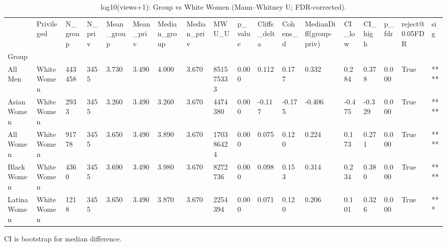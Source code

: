 \begin{table}[htbp]
\centering
\caption{log10(views+1): Group vs White Women (Mann–Whitney U; FDR-corrected).}
\label{tab:05-bias-views}
\begin{tabular}{llllllllllllllllll}
\toprule
 & Privileged & N\_group & N\_priv & Mean\_group & Mean\_priv & Median\_group & Median\_priv & MWU\_U & p\_value & Cliffs\_delta & Cohens\_d & MedianDiff(group-priv) & CI\_low & CI\_high & p\_fdr & reject@0.05FDR & sig \\
Group &  &  &  &  &  &  &  &  &  &  &  &  &  &  &  &  &  \\
\midrule
All Men & White Women & 443458 & 3455 & 3.730 & 3.490 & 4.000 & 3.670 & 851575333 & 0.000 & 0.112 & 0.177 & 0.332 & 0.284 & 0.378 & 0.000 & True & **** \\
Asian Women & White Women & 2933 & 3455 & 3.260 & 3.490 & 3.260 & 3.670 & 4474380 & 0.000 & -0.117 & -0.175 & -0.406 & -0.475 & -0.329 & 0.000 & True & **** \\
All Women & White Women & 91778 & 3455 & 3.650 & 3.490 & 3.890 & 3.670 & 170386424 & 0.000 & 0.075 & 0.120 & 0.224 & 0.173 & 0.271 & 0.000 & True & **** \\
Black Women & White Women & 4360 & 3455 & 3.690 & 3.490 & 3.980 & 3.670 & 8272736 & 0.000 & 0.098 & 0.153 & 0.314 & 0.234 & 0.380 & 0.000 & True & **** \\
Latina Women & White Women & 1218 & 3455 & 3.650 & 3.490 & 3.870 & 3.670 & 2254394 & 0.000 & 0.071 & 0.120 & 0.206 & 0.101 & 0.326 & 0.000 & True & *** \\
\bottomrule
\end{tabular}

\begin{tablenotes}[flushleft]
\item \small{CI is bootstrap for median difference.}
\end{tablenotes}
\end{table}